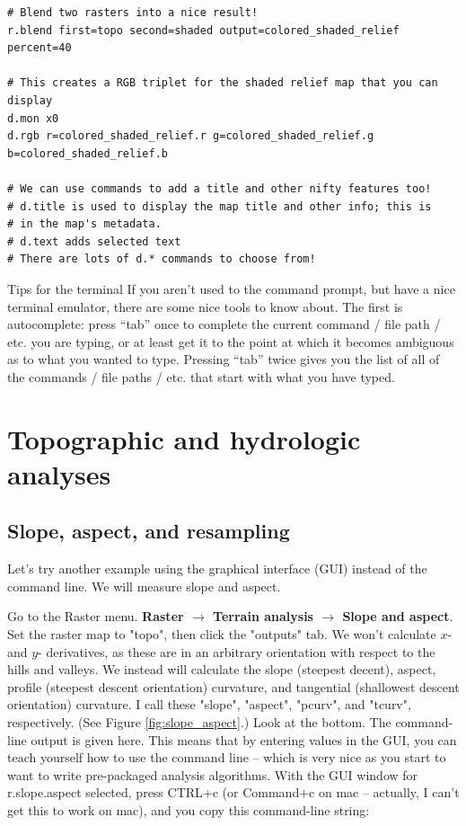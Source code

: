 \documentclass{book}
\begin{document}
\begin{lstlisting}
# Blend two rasters into a nice result!
r.blend first=topo second=shaded output=colored_shaded_relief percent=40

# This creates a RGB triplet for the shaded relief map that you can display
d.mon x0
d.rgb r=colored_shaded_relief.r g=colored_shaded_relief.g b=colored_shaded_relief.b

# We can use commands to add a title and other nifty features too!
# d.title is used to display the map title and other info; this is 
# in the map's metadata.
# d.text adds selected text
# There are lots of d.* commands to choose from!
\end{lstlisting}

\begin{boxx}[!ht]
\begin{bclogo}[arrondi = 0.1, logo = \bcrosevents]{Tips for the terminal}
If you aren't used to the command prompt, but have a nice terminal emulator, there are some nice tools to know about. The first is autocomplete: press ``tab'' once to complete the current command / file path / etc. you are typing, or at least get it to the point at which it becomes ambiguous as to what you wanted to type. Pressing ``tab'' twice gives you the list of all of the commands / file paths / etc. that start with what you have typed.
\end{bclogo}
\caption{Tips for the terminal}
\end{boxx}


\chapter{Topographic and hydrologic analyses}

\section{Slope, aspect, and resampling \label{s:slope.aspect.resample}}

Let's try another example using the graphical interface (GUI) instead of the command line. We will measure slope and aspect.

Go to the Raster menu. {\bf Raster $\rightarrow$ Terrain analysis $\rightarrow$ Slope and aspect}. Set the raster map to "topo", then click the "outputs" tab. We won't calculate $x$- and $y$- derivatives, as these are in an arbitrary orientation with respect to the hills and valleys. We instead will calculate the slope (steepest decent), aspect, profile (steepest descent orientation) curvature, and tangential (shallowest descent orientation) curvature. I call these "slope", "aspect", "pcurv", and "tcurv", respectively. (See Figure \ref{fig:slope_aspect}.) Look at the bottom. The command-line output is given here. This means that by entering values in the GUI, you can teach yourself how to use the command line -- which is very nice as you start to want to write pre-packaged analysis algorithms. With the GUI window for r.slope.aspect selected, press CTRL+c (or Command+c on mac -- actually, I can't get this to work on mac), and you copy this command-line string:
\end{document}
